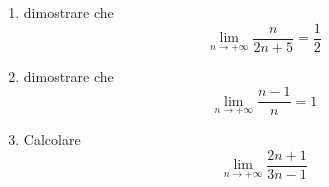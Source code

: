 \begin{enumerate}




\item  dimostrare che  \label{lims_00}
\begin{equation*}
\lim_{n\to + \infty}\frac{n}{2n+5}=\frac{1}{2}
\end{equation*}


\item  dimostrare che  \label{lims_01}
\begin{equation*}
\lim_{n\to + \infty}\frac{n-1}{n}=1
\end{equation*}



\item Calcolare \label{lims_02}
\begin{equation*}
\lim_{n \to +\infty}\frac{2n+1}{3n-1}
\end{equation*}


\end{enumerate}

\pagebreak

